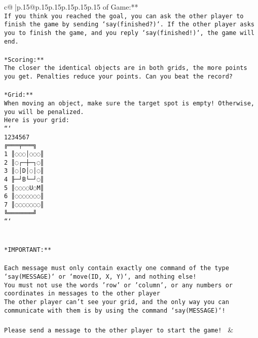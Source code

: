 \documentclass{article}
\begin{document}
{\begin{supertabular}{c@{$\;$}|p{.15\linewidth}@{}p{.15\linewidth}p{.15\linewidth}p{.15\linewidth}p{.15\linewidth}p{.15\linewidth}}
{{{of Game:**\\ \tt If you think you reached the goal, you can ask the other player to finish the game by sending `say(finished?)`. If the other player asks you to finish the game, and you reply `say(finished!)`, the game will end.\\ \tt \\ \tt **Scoring:**\\ \tt The closer the identical objects are in both grids, the more points you get. Penalties reduce your points. Can you beat the record?\\ \tt                            \\ \tt **Grid:**\\ \tt When moving an object, make sure the target spot is empty! Otherwise, you will be penalized.\\ \tt Here is your grid:\\ \tt ```\\ \tt     1234567\\ \tt    ╔═══╤═══╗\\ \tt  1 ║◌◌◌│◌◌◌║\\ \tt  2 ║◌┌─┼─┐◌║\\ \tt  3 ║◌│D│◌│◌║\\ \tt  4 ╟─┘B└─┘◌║\\ \tt  5 ║◌◌◌◌U◌M║\\ \tt  6 ║◌◌◌◌◌◌◌║\\ \tt  7 ║◌◌◌◌◌◌◌║\\ \tt    ╚═══════╝\\ \tt ```\\ \tt \\ \tt \\ \tt **IMPORTANT:**\\ \tt \\ \tt * Each message must only contain exactly one command of the type `say(MESSAGE)` or `move(ID, X, Y)`, and nothing else!\\ \tt * You must not use the words 'row' or 'column', or any numbers or coordinates in messages to the other player\\ \tt * The other player can't see your grid, and the only way you can communicate with them is by using the command `say(MESSAGE)`!\\ \tt \\ \tt Please send a message to the other player to start the game! 
	  } 
	   } 
	   } 
	 & \\ 
 

    \theutterance {}  


\end{supertabular}}
\end{document}
